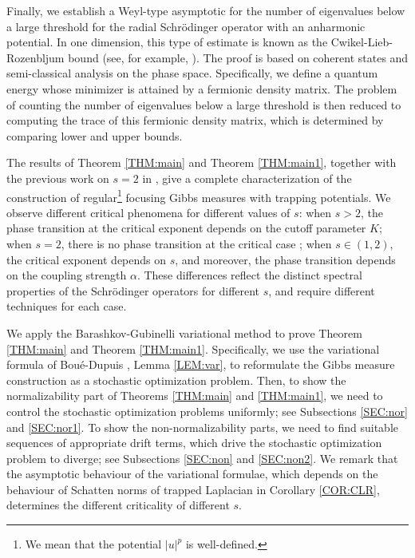 \documentclass[%
11pt,  reqno]{amsart}
\theoremstyle{remarkstyle}
\newcommand{\1}{\hspace{0.2mm}\text{I}\hspace{0.2mm}}
\newcommand{\al}{\alpha}
\numberwithin{equation}{section}
\numberwithin{theorem}{section}
\begin{document}
	Finally, we establish a Weyl-type asymptotic for the number of eigenvalues below a large threshold for the radial Schr\"odinger operator with an anharmonic potential. In one dimension, this type of estimate is known as the Cwikel-Lieb-Rozenbljum bound (see, for example, \cite[Lemma D.1]{DR23}). The proof is based on coherent states and semi-classical analysis on the phase space. Specifically, we define a quantum energy whose minimizer is attained by a fermionic density matrix. The problem of counting the number of eigenvalues below a large threshold is then reduced to computing the trace of this fermionic density matrix, which is determined by comparing lower and upper bounds.
	
	The results of Theorem \ref{THM:main} and Theorem \ref{THM:main1}, together with the previous work on $s = 2$ in \cite{RSTW22}, give a complete characterization of the construction of regular\footnote{We mean that the potential $|u|^p$ is well-defined.} focusing Gibbs measures with trapping potentials. We observe different critical phenomena for different values of $s$: when $s > 2$, the phase transition at the critical exponent depends on the cutoff parameter $K$; when $s = 2$, there is no phase transition at the critical case \cite{RSTW22}; when $s \in (1,2)$, the critical exponent depends on $s$, and moreover, the phase transition depends on the coupling strength $\al$. These differences reflect the distinct spectral properties of the Schr\"odinger operators for different $s$, and require different techniques for each case. 
	
	We apply the Barashkov-Gubinelli variational method \cite{BG20} to prove Theorem \ref{THM:main} and Theorem \ref{THM:main1}. Specifically, we use the variational formula of Bou\'e-Dupuis \cite{BD98,Zhang09}, Lemma \ref{LEM:var}, to reformulate the Gibbs measure construction as a stochastic optimization problem. Then, to show the normalizability part of Theorems \ref{THM:main} and \ref{THM:main1}, we need to control the stochastic optimization problems uniformly; see Subsections \ref{SEC:nor} and \ref{SEC:nor1}. To show the non-normalizability parts, we need to find suitable sequences of appropriate drift terms, which drive the stochastic optimization problem to diverge; see Subsections \ref{SEC:non} and \ref{SEC:non2}. We remark that the asymptotic behaviour of the variational formulae, which depends on the behaviour of Schatten norms of trapped Laplacian in Corollary \ref{COR:CLR}, determines the different criticality of different $s$.
	
\end{document}
